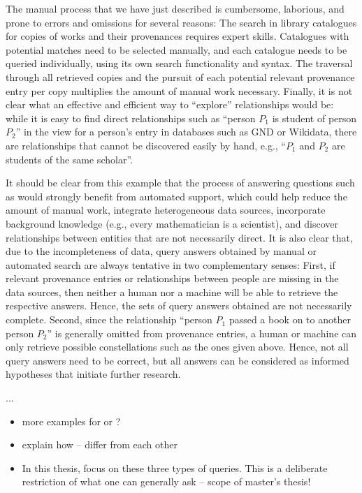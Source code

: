 The manual process that we have just described is cumbersome, laborious, and prone to errors and omissions for several reasons:
The search in library catalogues for copies of works and their provenances requires expert skills.
Catalogues with potential matches need to be selected manually,
and each catalogue needs to be queried individually, using its own search functionality and syntax. 
The traversal through all retrieved copies and the pursuit of each potential relevant provenance entry per copy 
multiplies the amount of manual work necessary.
Finally, it is not clear what an effective and efficient way to ``explore'' relationships would be:
while it is easy to find direct relationships such as ``person $P_1$ is student of person $P_2$'' in the view for a person's entry
in databases such as GND or Wikidata, there are relationships that cannot be discovered easily by hand,
e.g., ``$P_1$ and $P_2$ are students of the same scholar''.

It should be clear from this example that the process of answering questions such as 
would strongly benefit from automated support, which could help reduce the amount of manual work, integrate heterogeneous data sources,
incorporate background knowledge (e.g., every mathematician is a scientist),
and discover relationships between entities that are not necessarily direct.
It is also clear that, due to the incompleteness of data, query answers obtained by manual or automated search
are always tentative in two complementary senses: First, if relevant provenance entries or relationships between people are missing
in the data sources, then neither a human nor a machine will be able to retrieve the respective answers. Hence, the sets of query answers obtained
are not necessarily complete.
Second, since the relationship ``person $P_1$ passed a book on to another person $P_2$'' is generally omitted from
provenance entries, a human or machine can only retrieve possible constellations such as the ones
given above. Hence, not all query answers need to be correct, but all answers can be considered
as informed hypotheses that initiate further research.


...
%
\begin{itemize}
  \item
    more examples for  or ?
  \item
    explain how -- differ from each other
  \item
    In this thesis, focus on these three types of queries.
    This is a deliberate restriction of what one can generally ask – scope of master's thesis!
\end{itemize}


